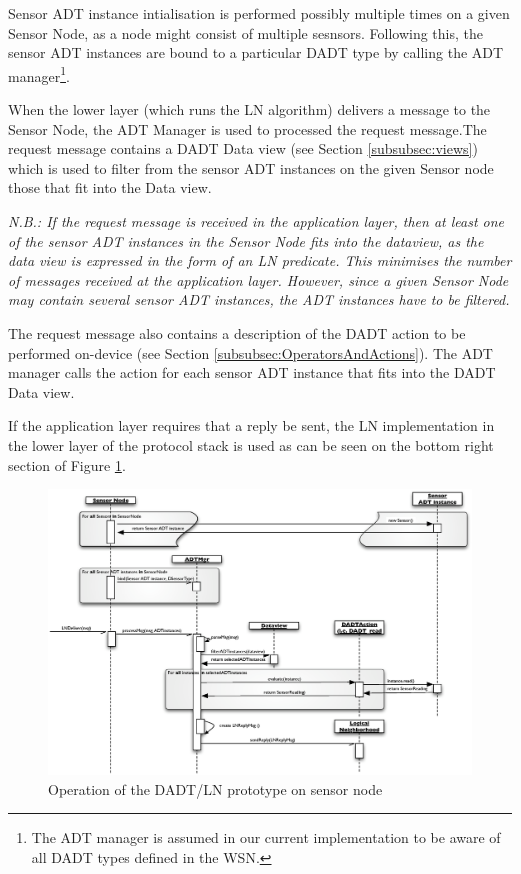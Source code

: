 Sensor ADT instance intialisation is performed possibly
multiple times
on a given Sensor Node, as a node might consist of multiple sesnsors. Following
this, the sensor ADT instances are bound to a particular DADT type by calling
the ADT manager\footnote{The ADT manager is assumed in our
current implementation to be aware of all DADT types defined in the WSN.}.

When the lower layer (which runs the LN algorithm) delivers a message to the
Sensor Node, the ADT Manager is used to processed the request message.The
request message contains a DADT Data view (see Section \ref{subsubsec:views})
which is used to filter from the sensor ADT instances on the given Sensor node
those that fit into the Data view. %

\emph{N.B.: If the request message is received in the application layer, then at least
one of the sensor ADT instances in the Sensor Node fits into the dataview, as
the data view is expressed in the form of an LN predicate. This minimises the
number of messages received at the application layer. However, since a given
Sensor Node may contain several sensor ADT instances, the ADT instances have to
be filtered.}

The request message also contains a description of the DADT action to be
performed on-device (see Section
\ref{subsubsec:OperatorsAndActions}). The ADT manager calls the action for each
sensor ADT instance that fits into the DADT Data view. 

If the application layer requires that a reply be sent, the LN implementation in
the lower layer of the protocol stack is used as can be seen on the bottom right
section of Figure \ref{Fig:SeqDiagram_Sensornode}.

\begin{figure}[p]
\centering
\label{Fig:SeqDiagram_Sensornode}
\includegraphics[scale=0.65]{img/SeqDiagram_Sensornode.eps} 
\caption[Operation
of the DADT/LN prototype on sensor node]{Operation
of the DADT/LN prototype on sensor node}
\end{figure} 


